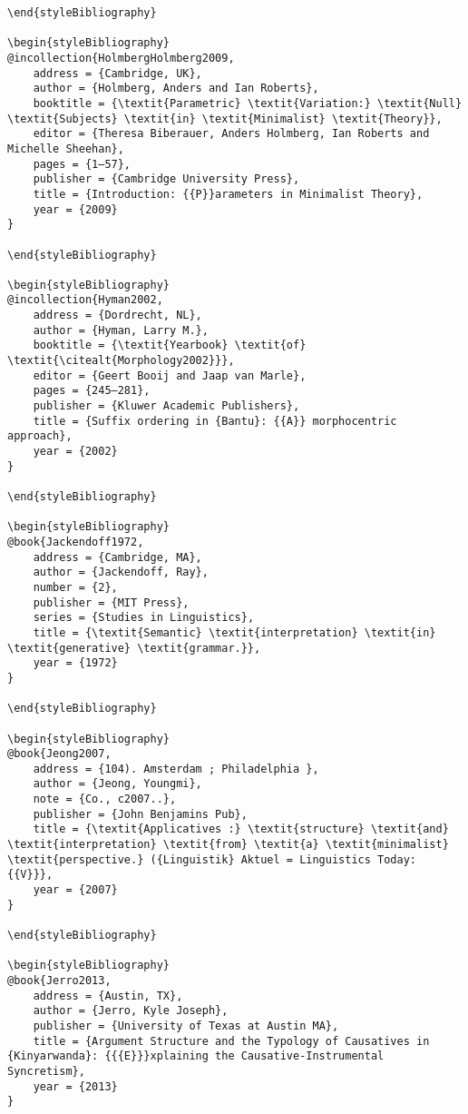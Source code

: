 \documentclass[output=paper]{langscibook}
\begin{document}
\begin{verbatim}
\end{styleBibliography}

\begin{styleBibliography}
@incollection{HolmbergHolmberg2009,
	address = {Cambridge, UK},
	author = {Holmberg, Anders and Ian Roberts},
	booktitle = {\textit{Parametric} \textit{Variation:} \textit{Null} \textit{Subjects} \textit{in} \textit{Minimalist} \textit{Theory}},
	editor = {Theresa Biberauer, Anders Holmberg, Ian Roberts and Michelle Sheehan},
	pages = {1–57},
	publisher = {Cambridge University Press},
	title = {Introduction: {{P}}arameters in Minimalist Theory},
	year = {2009}
}

\end{styleBibliography}

\begin{styleBibliography}
@incollection{Hyman2002,
	address = {Dordrecht, NL},
	author = {Hyman, Larry M.},
	booktitle = {\textit{Yearbook} \textit{of} \textit{\citealt{Morphology2002}}},
	editor = {Geert Booij and Jaap van Marle},
	pages = {245–281},
	publisher = {Kluwer Academic Publishers},
	title = {Suffix ordering in {Bantu}: {{A}} morphocentric approach},
	year = {2002}
}

\end{styleBibliography}

\begin{styleBibliography}
@book{Jackendoff1972,
	address = {Cambridge, MA},
	author = {Jackendoff, Ray},
	number = {2},
	publisher = {MIT Press},
	series = {Studies in Linguistics},
	title = {\textit{Semantic} \textit{interpretation} \textit{in} \textit{generative} \textit{grammar.}},
	year = {1972}
}

\end{styleBibliography}

\begin{styleBibliography}
@book{Jeong2007,
	address = {104). Amsterdam ; Philadelphia },
	author = {Jeong, Youngmi},
	note = {Co., c2007..},
	publisher = {John Benjamins Pub},
	title = {\textit{Applicatives :} \textit{structure} \textit{and} \textit{interpretation} \textit{from} \textit{a} \textit{minimalist} \textit{perspective.} ({Linguistik} Aktuel = Linguistics Today: {{V}}},
	year = {2007}
}

\end{styleBibliography}

\begin{styleBibliography}
@book{Jerro2013,
	address = {Austin, TX},
	author = {Jerro, Kyle Joseph},
	publisher = {University of Texas at Austin MA},
	title = {Argument Structure and the Typology of Causatives in {Kinyarwanda}: {{{E}}}xplaining the Causative-Instrumental Syncretism},
	year = {2013}
}


\end{verbatim}
\end{document}
